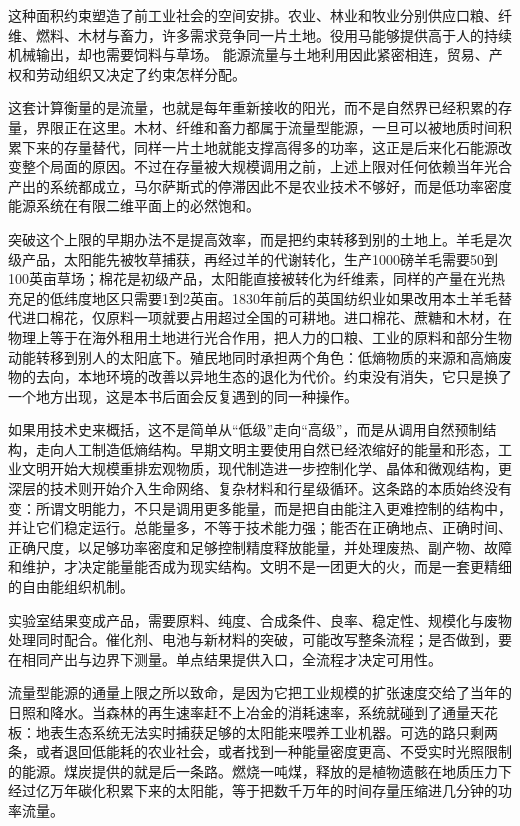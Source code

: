 这种面积约束塑造了前工业社会的空间安排。农业、林业和牧业分别供应口粮、纤维、燃料、木材与畜力，许多需求竞争同一片土地。役用马能够提供高于人的持续机械输出，却也需要饲料与草场。\cite{smil2015power} 能源流量与土地利用因此紧密相连，贸易、产权和劳动组织又决定了约束怎样分配。

这套计算衡量的是流量，也就是每年重新接收的阳光，而不是自然界已经积累的存量，界限正在这里。木材、纤维和畜力都属于流量型能源，一旦可以被地质时间积累下来的存量替代，同样一片土地就能支撑高得多的功率，这正是后来化石能源改变整个局面的原因。不过在存量被大规模调用之前，上述上限对任何依赖当年光合产出的系统都成立，马尔萨斯式的停滞因此不是农业技术不够好，而是低功率密度能源系统在有限二维平面上的必然饱和。

突破这个上限的早期办法不是提高效率，而是把约束转移到别的土地上。羊毛是次级产品，太阳能先被牧草捕获，再经过羊的代谢转化，生产1000磅羊毛需要50到100英亩草场；棉花是初级产品，太阳能直接被转化为纤维素，同样的产量在光热充足的低纬度地区只需要1到2英亩。1830年前后的英国纺织业如果改用本土羊毛替代进口棉花，仅原料一项就要占用超过全国的可耕地。进口棉花、蔗糖和木材，在物理上等于在海外租用土地进行光合作用，把人力的口粮、工业的原料和部分生物动能转移到别人的太阳底下。殖民地同时承担两个角色：低熵物质的来源和高熵废物的去向，本地环境的改善以异地生态的退化为代价。约束没有消失，它只是换了一个地方出现，这是本书后面会反复遇到的同一种操作。

如果用技术史来概括，这不是简单从“低级”走向“高级”，而是从调用自然预制结构，走向人工制造低熵结构。早期文明主要使用自然已经浓缩好的能量和形态，工业文明开始大规模重排宏观物质，现代制造进一步控制化学、晶体和微观结构，更深层的技术则开始介入生命网络、复杂材料和行星级循环。这条路的本质始终没有变：所谓文明能力，不只是调用更多能量，而是把自由能注入更难控制的结构中，并让它们稳定运行。总能量多，不等于技术能力强；能否在正确地点、正确时间、正确尺度，以足够功率密度和足够控制精度释放能量，并处理废热、副产物、故障和维护，才决定能量能否成为现实结构。文明不是一团更大的火，而是一套更精细的自由能组织机制。

实验室结果变成产品，需要原料、纯度、合成条件、良率、稳定性、规模化与废物处理同时配合。催化剂、电池与新材料的突破，可能改写整条流程；是否做到，要在相同产出与边界下测量。单点结果提供入口，全流程才决定可用性。


流量型能源的通量上限之所以致命，是因为它把工业规模的扩张速度交给了当年的日照和降水。当森林的再生速率赶不上冶金的消耗速率，系统就碰到了通量天花板：地表生态系统无法实时捕获足够的太阳能来喂养工业机器。可选的路只剩两条，或者退回低能耗的农业社会，或者找到一种能量密度更高、不受实时光照限制的能源。煤炭提供的就是后一条路。燃烧一吨煤，释放的是植物遗骸在地质压力下经过亿万年碳化积累下来的太阳能，等于把数千万年的时间存量压缩进几分钟的功率流量。

